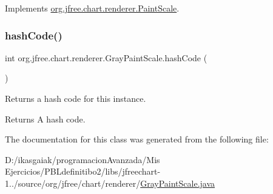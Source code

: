 Implements \mbox{\hyperlink{interfaceorg_1_1jfree_1_1chart_1_1renderer_1_1_paint_scale_abf6986bb5661248213645ea975828495}{org.\+jfree.\+chart.\+renderer.\+Paint\+Scale}}.

\mbox{\label{classorg_1_1jfree_1_1chart_1_1renderer_1_1_gray_paint_scale_a14607607420ae77369321fc1bbd15bd0}} 
\subsubsection{\texorpdfstring{hash\+Code()}{hashCode()}}
{\footnotesize\ttfamily int org.\+jfree.\+chart.\+renderer.\+Gray\+Paint\+Scale.\+hash\+Code (\begin{DoxyParamCaption}{ }\end{DoxyParamCaption})}

Returns a hash code for this instance.

\begin{DoxyReturn}{Returns}
A hash code. 
\end{DoxyReturn}


The documentation for this class was generated from the following file\+:\begin{DoxyCompactItemize}
\item 
D\+:/ikasgaiak/programacion\+Avanzada/\+Mis Ejercicios/\+P\+B\+Ldefinitibo2/libs/jfreechart-\/1../source/org/jfree/chart/renderer/\mbox{\hyperlink{_gray_paint_scale_8java}{Gray\+Paint\+Scale.\+java}}\end{DoxyCompactItemize}
